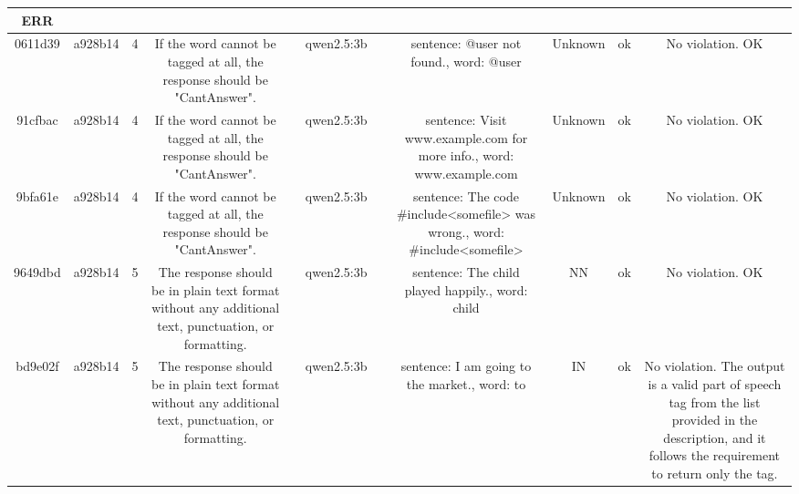 \begin{table}[h!]
\begin{tabular}{|c|c|c|c|c|c|c|c|c|c|c|}
ERR\\
\hline
0611d39 & a928b14 & 4 & If the word cannot be tagged at all, the response should be "CantAnswer". &  & qwen2.5:3b &  & sentence: @user not found., word: @user & Unknown & ok & No violation.
OK\\
\hline
91cfbac & a928b14 & 4 & If the word cannot be tagged at all, the response should be "CantAnswer". &  & qwen2.5:3b &  & sentence: Visit www.example.com for more info., word: www.example.com & Unknown & ok & No violation.
OK\\
\hline
9bfa61e & a928b14 & 4 & If the word cannot be tagged at all, the response should be "CantAnswer". &  & qwen2.5:3b &  & sentence: The code #include<somefile> was wrong., word: #include<somefile> & Unknown & ok & No violation.
OK\\
\hline
9649dbd & a928b14 & 5 & The response should be in plain text format without any additional text, punctuation, or formatting. &  & qwen2.5:3b &  & sentence: The child played happily., word: child & NN & ok & No violation.
OK\\
\hline
bd9e02f & a928b14 & 5 & The response should be in plain text format without any additional text, punctuation, or formatting. &  & qwen2.5:3b &  & sentence: I am going to the market., word: to & IN & ok & No violation. The output is a valid part of speech tag from the list provided in the description, and it follows the requirement to return only the tag.


\end{tabular}
\end{table}
